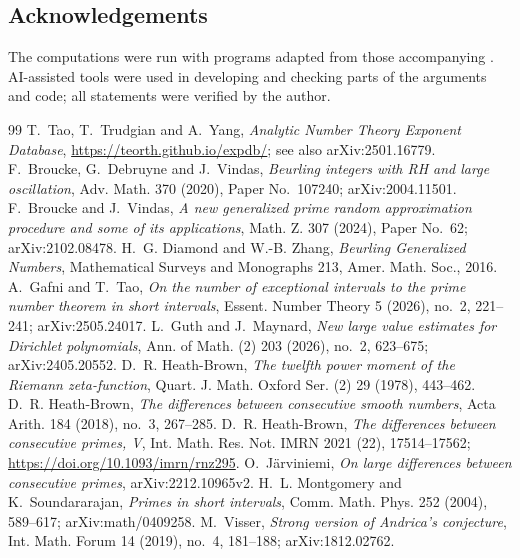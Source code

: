 \documentclass[11pt]{amsart}
\theoremstyle{definition}
\theoremstyle{remark}
\begin{document}
\subsection*{Acknowledgements}
The computations were run with programs adapted from those accompanying \cite{J}. AI-assisted tools were used in developing and checking parts of the arguments and code; all statements were verified by the author.

\begin{thebibliography}{99}
 T.~Tao, T.~Trudgian and A.~Yang, \emph{Analytic Number Theory Exponent Database}, \url{https://teorth.github.io/expdb/}; see also arXiv:2501.16779.
 F.~Broucke, G.~Debruyne and J.~Vindas, \emph{Beurling integers with RH and large oscillation}, Adv. Math. 370 (2020), Paper No.~107240; arXiv:2004.11501.
 F.~Broucke and J.~Vindas, \emph{A new generalized prime random approximation procedure and some of its applications}, Math. Z. 307 (2024), Paper No.~62; arXiv:2102.08478.
 H.~G. Diamond and W.-B. Zhang, \emph{Beurling Generalized Numbers}, Mathematical Surveys and Monographs 213, Amer. Math. Soc., 2016.
 A.~Gafni and T.~Tao, \emph{On the number of exceptional intervals to the prime number theorem in short intervals}, Essent. Number Theory 5 (2026), no.~2, 221--241; arXiv:2505.24017.
 L.~Guth and J.~Maynard, \emph{New large value estimates for Dirichlet polynomials}, Ann. of Math. (2) 203 (2026), no.~2, 623--675; arXiv:2405.20552.
 D.~R. Heath-Brown, \emph{The twelfth power moment of the Riemann zeta-function}, Quart. J. Math. Oxford Ser. (2) 29 (1978), 443--462.
 D.~R. Heath-Brown, \emph{The differences between consecutive smooth numbers}, Acta Arith. 184 (2018), no.~3, 267--285.
 D.~R. Heath-Brown, \emph{The differences between consecutive primes, V}, Int. Math. Res. Not. IMRN 2021 (22), 17514--17562; \url{https://doi.org/10.1093/imrn/rnz295}.
 O.~Järviniemi, \emph{On large differences between consecutive primes}, arXiv:2212.10965v2.
 H.~L. Montgomery and K.~Soundararajan, \emph{Primes in short intervals}, Comm. Math. Phys. 252 (2004), 589--617; arXiv:math/0409258.
 M.~Visser, \emph{Strong version of Andrica's conjecture}, Int. Math. Forum 14 (2019), no.~4, 181--188; arXiv:1812.02762.
\end{thebibliography}
\end{document}
